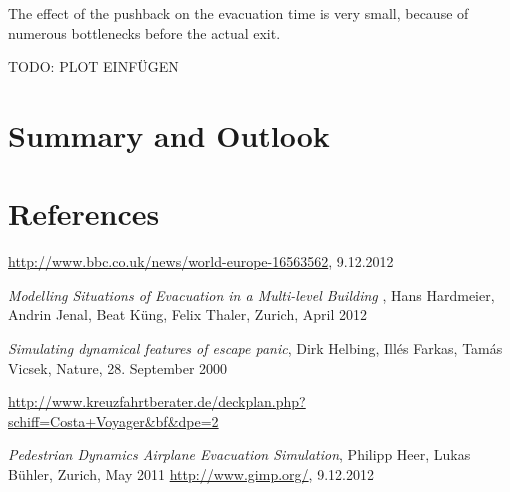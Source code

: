 \documentclass[11pt]{article}
\begin{document}
The effect of the pushback on the evacuation time is very small, because of
numerous bottlenecks before the actual exit.

TODO: PLOT EINFÜGEN


\section{Summary and Outlook}

\section{References}



\begingroup 
\renewcommand{\section}[2]{}%
\begin{thebibliography}{9}

		\url{http://www.bbc.co.uk/news/world-europe-16563562}, 9.12.2012

	\emph{Modelling Situations of Evacuation
in a Multi-level Building} , 
Hans Hardmeier, Andrin Jenal, Beat K\"ung, Felix Thaler, Zurich, April 2012

		\emph{Simulating dynamical features of escape panic},
		Dirk Helbing, Ill\'es Farkas, Tam\'as Vicsek, Nature, 28. September 2000

		\url{http://www.kreuzfahrtberater.de/deckplan.php?schiff=Costa+Voyager&bf&dpe=2}

		\emph{Pedestrian Dynamics Airplane Evacuation Simulation},
		Philipp Heer, Lukas Bühler, Zurich, May 2011
		\url{http://www.gimp.org/}, 9.12.2012
\end{thebibliography}
\endgroup
\end{document}
